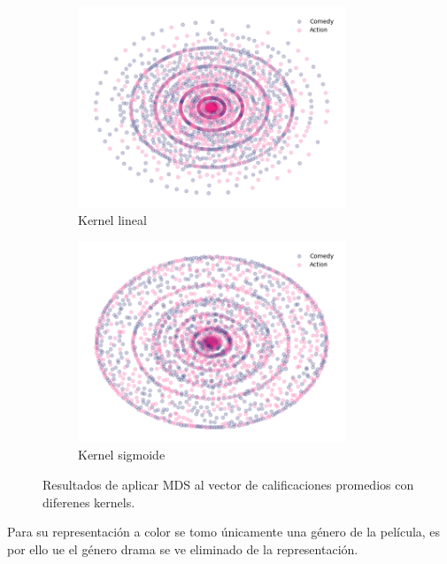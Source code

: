 \begin{figure}[H]
\begin{subfigure}{8cm}
        \includegraphics[width=8cm]{Graphics/Problema_3_2/MDS_linear.png}
        \caption{Kernel lineal}
    \end{subfigure}
    \begin{subfigure}{8cm}
        \includegraphics[width=8cm]{Graphics/Problema_3_2/MDS_sigmod.png}
        \caption{Kernel sigmoide}
    \end{subfigure}
    \caption{Resultados de aplicar MDS al vector de calificaciones promedios con diferenes kernels.}
\end{figure}

Para su representación a color se tomo únicamente una género de la película, es por ello ue el género drama se ve eliminado de la representación.
